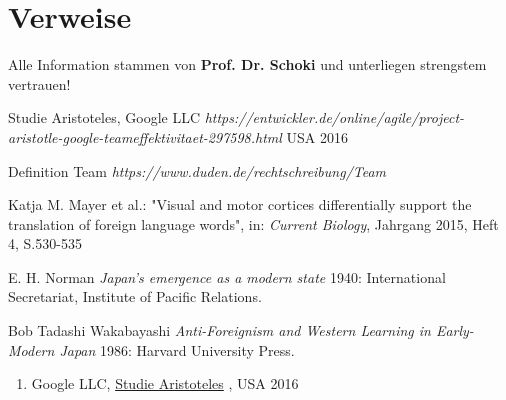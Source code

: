 \documentclass[12pt]{scrartcl}
\begin{document}
\section{Verweise}
Alle Information stammen von \textbf{Prof. Dr. Schoki} und unterliegen strengstem vertrauen! 

\renewcommand{\bibname}{Literaturverzeichnis}
\begin{thebibliography}{1}

   Studie Aristoteles, Google LLC {\em https://entwickler.de/online/agile/project-aristotle-google-teameffektivitaet-297598.html} USA 2016

   Definition Team {\em https://www.duden.de/rechtschreibung/Team}

    Katja M. Mayer et al.: "Visual and motor cortices differentially support the translation of foreign language words", in: \textit{Current Biology}, Jahrgang 2015, Heft 4, S.530-535


   E. H. Norman {\em Japan's emergence as a modern
  state} 1940: International Secretariat, Institute of Pacific
  Relations.

   Bob Tadashi Wakabayashi {\em Anti-Foreignism and Western
  Learning in Early-Modern Japan} 1986: Harvard University Press.

  \end{thebibliography}
\begin{enumerate}
\item Google LLC, \href {https://entwickler.de/online/agile/project-aristotle-google-teameffektivitaet-297598.html}{Studie Aristoteles} , USA 2016
\end{enumerate}
\end{document}
